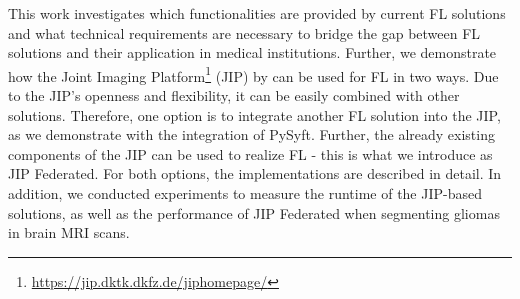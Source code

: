 This work investigates which functionalities are provided by current FL solutions and what technical requirements are necessary to bridge the gap between FL solutions and their application in medical institutions. 
Further, we demonstrate how the Joint Imaging Platform\footnote{\url{https://jip.dktk.dkfz.de/jiphomepage/}} (JIP) by \cite{Scherer2020JointAnalytics} can be used for FL in two ways.
Due to the JIP's openness and flexibility, it can be easily combined with other solutions. Therefore, one option is to integrate another FL solution into the JIP, as we demonstrate with the integration of PySyft. Further, the already existing components of the JIP can be used to realize FL - this is what we introduce as JIP Federated. For both options, the implementations are described in detail. 
In addition, we conducted experiments to measure the runtime of the JIP-based solutions, as well as the performance of JIP Federated when segmenting gliomas in brain MRI scans.

